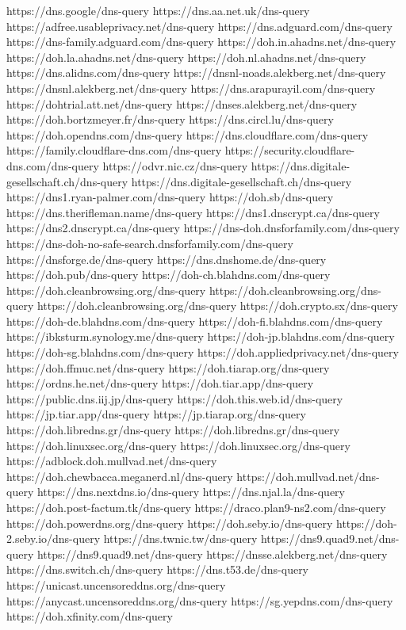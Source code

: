 https://dns.google/dns-query
https://dns.aa.net.uk/dns-query
https://adfree.usableprivacy.net/dns-query
https://dns.adguard.com/dns-query
https://dns-family.adguard.com/dns-query
https://doh.in.ahadns.net/dns-query
https://doh.la.ahadns.net/dns-query
https://doh.nl.ahadns.net/dns-query
https://dns.alidns.com/dns-query
https://dnsnl-noads.alekberg.net/dns-query
https://dnsnl.alekberg.net/dns-query
https://dns.arapurayil.com/dns-query
https://dohtrial.att.net/dns-query
https://dnses.alekberg.net/dns-query
https://doh.bortzmeyer.fr/dns-query
https://dns.circl.lu/dns-query
https://doh.opendns.com/dns-query
https://dns.cloudflare.com/dns-query
https://family.cloudflare-dns.com/dns-query
https://security.cloudflare-dns.com/dns-query
https://odvr.nic.cz/dns-query
https://dns.digitale-gesellschaft.ch/dns-query
https://dns.digitale-gesellschaft.ch/dns-query
https://dns1.ryan-palmer.com/dns-query
https://doh.sb/dns-query
https://dns.therifleman.name/dns-query
https://dns1.dnscrypt.ca/dns-query
https://dns2.dnscrypt.ca/dns-query
https://dns-doh.dnsforfamily.com/dns-query
https://dns-doh-no-safe-search.dnsforfamily.com/dns-query
https://dnsforge.de/dns-query
https://dns.dnshome.de/dns-query
https://doh.pub/dns-query
https://doh-ch.blahdns.com/dns-query
https://doh.cleanbrowsing.org/dns-query
https://doh.cleanbrowsing.org/dns-query
https://doh.cleanbrowsing.org/dns-query
https://doh.crypto.sx/dns-query
https://doh-de.blahdns.com/dns-query
https://doh-fi.blahdns.com/dns-query
https://ibksturm.synology.me/dns-query
https://doh-jp.blahdns.com/dns-query
https://doh-sg.blahdns.com/dns-query
https://doh.appliedprivacy.net/dns-query
https://doh.ffmuc.net/dns-query
https://doh.tiarap.org/dns-query
https://ordns.he.net/dns-query
https://doh.tiar.app/dns-query
https://public.dns.iij.jp/dns-query
https://doh.this.web.id/dns-query
https://jp.tiar.app/dns-query
https://jp.tiarap.org/dns-query
https://doh.libredns.gr/dns-query
https://doh.libredns.gr/dns-query
https://doh.linuxsec.org/dns-query
https://doh.linuxsec.org/dns-query
https://adblock.doh.mullvad.net/dns-query
https://doh.chewbacca.meganerd.nl/dns-query
https://doh.mullvad.net/dns-query
https://dns.nextdns.io/dns-query
https://dns.njal.la/dns-query
https://doh.post-factum.tk/dns-query
https://draco.plan9-ns2.com/dns-query
https://doh.powerdns.org/dns-query
https://doh.seby.io/dns-query
https://doh-2.seby.io/dns-query
https://dns.twnic.tw/dns-query
https://dns9.quad9.net/dns-query
https://dns9.quad9.net/dns-query
https://dnsse.alekberg.net/dns-query
https://dns.switch.ch/dns-query
https://dns.t53.de/dns-query
https://unicast.uncensoreddns.org/dns-query
https://anycast.uncensoreddns.org/dns-query
https://sg.yepdns.com/dns-query
https://doh.xfinity.com/dns-query